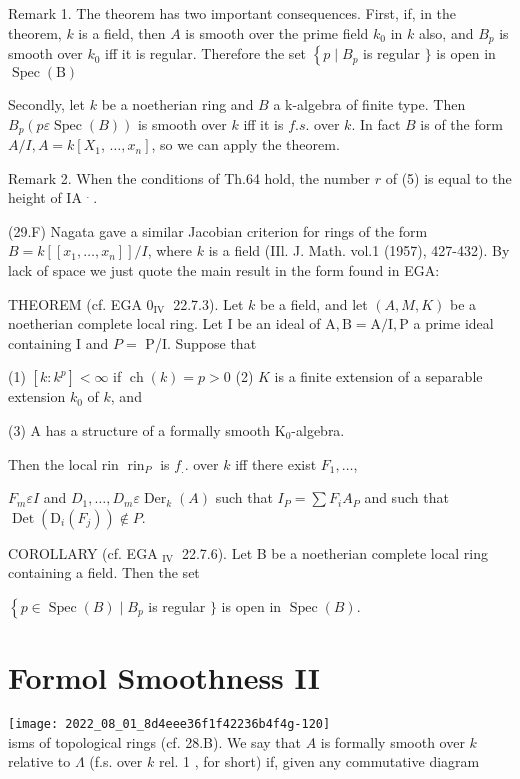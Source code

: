 Remark 1. The theorem has two important consequences. First, if, in the theorem, $k$ is a field, then $A$ is smooth over the prime field $k_{0}$ in $k$ also, and $B_{p}$ is smooth over $k_{0}$ iff it is regular. Therefore the set $\left\{p \mid B_{p}\right.$ is regular $\}$ is open in $\operatorname{Spec}(\mathrm{B})$

Secondly, let $k$ be a noetherian ring and $B$ a k-algebra of finite type. Then $B_{p}(p \varepsilon \operatorname{Spec}(B))$ is smooth over $k$ iff it is $f . s$. over $k$. In fact $B$ is of the form $A / I, A=k\left[X_{1}\right.$, $\left.\ldots, x_{n}\right]$, so we can apply the theorem.

Remark 2. When the conditions of Th.64 hold, the number $r$ of (5) is equal to the height of IA ${ }^{\text {. }}$.

(29.F) Nagata gave a similar Jacobian criterion for rings of the form $B=k\left[\left[x_{1}, \ldots, x_{n}\right]\right] / I$, where $k$ is a field (IIl. J. Math. vol.1 (1957), 427-432). By lack of space we just quote the main result in the form found in EGA:

THEOREM (cf. EGA $0_{\text {IV }}$ 22.7.3). Let $k$ be a field, and let $(A, M, K)$ be a noetherian complete local ring. Let I be an ideal of $\mathrm{A}, \mathrm{B}=\mathrm{A} / \mathrm{I}, \mathrm{P}$ a prime ideal containing $\mathrm{I}$ and $P=$ P/I. Suppose that

(1) $\left[k: k^{p}\right]<\infty$ if $\operatorname{ch}(k)=p>0$ (2) $K$ is a finite extension of a separable extension $k_{0}$ of $k$, and

(3) A has a structure of a formally smooth $\mathrm{K}_{0}$-algebra.

Then the local rin $\operatorname{rin}_{P}$ is $f_{.}$. over $k$ iff there exist $F_{1}, \ldots$,

$F_{m} \varepsilon I$ and $D_{1}, \ldots, D_{m} \varepsilon \operatorname{Der}_{k}(A)$ such that $I_{P}=\sum F_{i} A_{P}$ and such that $\operatorname{Det}\left(\mathrm{D}_{i}\left(F_{j}\right)\right) \notin P$.

COROLLARY (cf. EGA ${ }_{\text {IV }}$ 22.7.6). Let B be a noetherian complete local ring containing a field. Then the set

$\left\{p \in \operatorname{Spec}(B) \mid B_{p}\right.$ is regular $\}$ is open in $\operatorname{Spec}(B) .$

\section{Formol Smoothness II}
\texttt{[image: 2022\_08\_01\_8d4eee36f1f42236b4f4g-120]}\\
isms of topological rings (cf. 28.B). We say that $A$ is formally smooth over $k$ relative to $\Lambda$ (f.s. over $k$ rel. 1 , for short) if, given any commutative diagram

